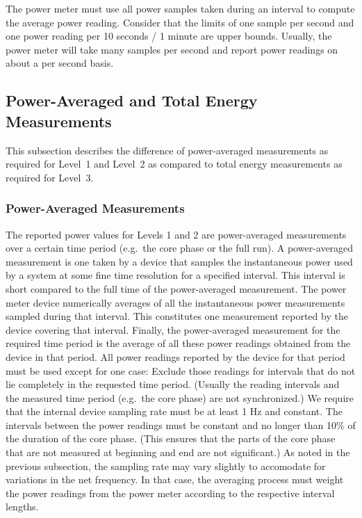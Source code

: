 \noindent
The power meter must use all power samples taken during an interval to compute the average power reading.
Consider that the limits of one sample per second and one power reading per 10 seconds / 1 minute are upper bounds.
Usually, the power meter will take many samples per second and report power readings on about a per second basis.

\subsection{Power-Averaged and Total Energy Measurements}
\label{sec:PAaTEM}

This subsection describes the difference of power-averaged measurements as required for Level~1 and Level~2 as compared to total energy measurements as required for Level~3.

\subsubsection{Power-Averaged Measurements}

\noindent
The reported power values for Levels 1 and 2 are power-averaged measurements over a certain time period (e.g.~the core phase or the full run).
A power-averaged measurement is one taken by a device that samples the instantaneous power used by a system at some fine time resolution for a specified interval.
This interval is short compared to the full time of the power-averaged measurement.
The power meter device numerically averages of all the instantaneous power measurements sampled during that interval.
This constitutes one measurement reported by the device covering that interval.
Finally, the power-averaged measurement for the required time period is the average of all these power readings obtained from the device in that period.
All power readings reported by the device for that period must be used except for one case:
Exclude those readings for intervals that do not lie completely in the requested time period.
(Usually the reading intervals and the measured time period (e.g.~the core phase) are not synchronized.)
We require that the internal device sampling rate must be at least 1 Hz and constant.
The intervals between the power readings must be constant and no longer than 10\% of the duration of the core phase.
(This ensures that the parts of the core phase that are not measured at beginning and end are not significant.)
As noted in the previous subsection, the sampling rate may vary slightly to accomodate for variations in the net frequency.
In that case, the averaging process must weight the power readings from the power meter according to the respective interval lengths.
\wl

